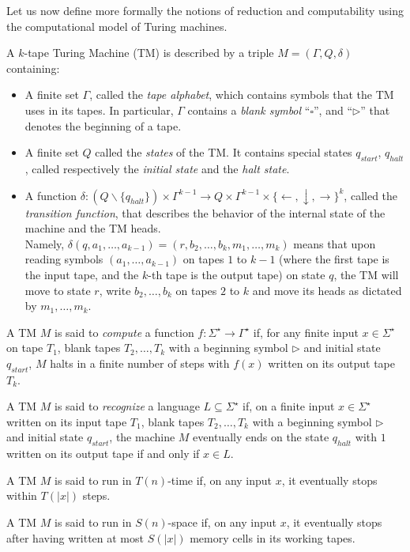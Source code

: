 Let us now define more formally the notions of reduction and computability using the computational model of Turing machines.

\begin{definition} \label{de:turing-machine} 
  A $k$-tape Turing Machine (TM) is described by a triple $M = (\Gamma, Q, \delta)$ containing:
  \begin{itemize}
    \item A finite set $\Gamma$, called the \textit{tape alphabet}, which contains symbols that the TM uses in its tapes. In particular, $\Gamma$ contains a \textit{blank symbol} ``$\square$'', and ``$\triangleright$'' that denotes the beginning of a tape.
    \item A finite set $Q$ called the \textit{states} of the TM. It contains special states $q_{start}$, $q_{halt}$, called respectively the \textit{initial state} and the \textit{halt state}.
    \item A function $\delta: (Q \backslash \{q_{halt}\}) \times \Gamma^{k-1} \to Q \times \Gamma^{k-1} \times \{ \leftarrow, \downarrow, \rightarrow \}^k$, called the \textit{transition function}, that describes the behavior of the internal state of the machine and the TM heads.\\
      \smallskip
      Namely, $\delta(q, a_1, \ldots, a_{k-1}) = (r, b_2, \ldots, b_k, m_1, \ldots, m_k)$ means that upon reading symbols $(a_1, \ldots, a_{k-1})$ on tapes $1$ to $k-1$ (where the first tape is the input tape, and the $k$-th tape is the output tape) on state $q$, the TM will move to state $r$, write $b_2, \ldots, b_k$ on tapes $2$ to $k$ and move its heads as dictated by $m_1, \ldots, m_k$.
  \end{itemize}

  A TM $M$ is said to \emph{compute} a function $f: \Sigma^\star \to \Gamma^\star$ if, for any finite input $x \in \Sigma^\star$ on tape $T_1$, blank tapes $T_2, \ldots, T_k$ with a beginning symbol $\triangleright$ and initial state $q_{start}$, $M$ halts in a finite number of steps with $f(x)$ written on its output tape $T_k$.

  A TM $M$ is said to \emph{recognize} a language $L \subseteq \Sigma^\star$ if, on a finite input $x \in \Sigma^\star$ written on its input tape $T_1$, blank tapes $T_2, \ldots, T_k$ with a beginning symbol $\triangleright$ and initial state $q_{start}$, the machine $M$ eventually ends on the state $q_{halt}$ with $1$ written on its output tape if and only if $x \in L$.

  A TM $M$ is said to run in $T(n)$-time if, on any input $x$, it eventually stops within $T(|x|)$ steps.

  A TM $M$ is said to run in $S(n)$-space if, on any input $x$, it eventually stops after having written at most $S(|x|)$ memory cells in its working tapes.
\end{definition}

